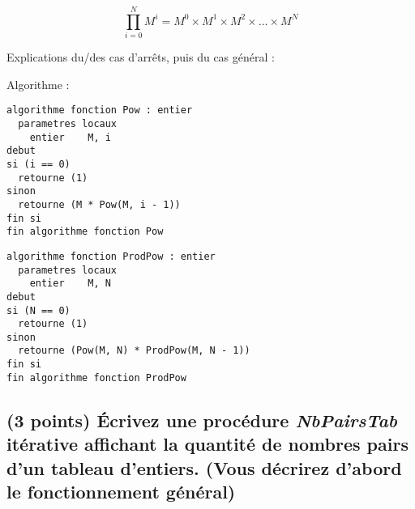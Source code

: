 \documentclass[11pt,a4paper]{article}
\begin{document}
\begin{center}

\begin{equation*}
\prod^{N}_{i = 0} M^{i} = M^{0} \times M^{1} \times M^{2} \times ... \times M^{N}
\end{equation*}

Explications du/des cas d'arrêts, puis du cas général :

\bigskip

Algorithme :

\begin{lstlisting}[style=algorithmique]
algorithme fonction Pow : entier
  parametres locaux
    entier    M, i
debut
si (i == 0)
  retourne (1)
sinon
  retourne (M * Pow(M, i - 1))
fin si
fin algorithme fonction Pow \end{lstlisting}

\begin{lstlisting}[style=algorithmique]
algorithme fonction ProdPow : entier
  parametres locaux
    entier    M, N
debut
si (N == 0)
  retourne (1)
sinon
  retourne (Pow(M, N) * ProdPow(M, N - 1))
fin si
fin algorithme fonction ProdPow \end{lstlisting}

\end{center}

\smallskip




%
%
%
%


\clearpage


\subsection{(3 points) \'Ecrivez une procédure \og \textit{NbPairsTab} \fg{} itérative affichant la quantité de nombres pairs d'un tableau d'entiers. (Vous décrirez d'abord le fonctionnement général) }
\end{document}
